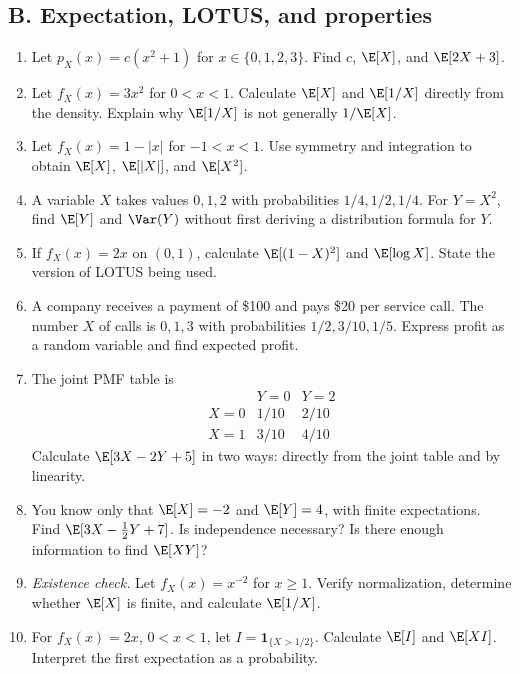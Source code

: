 \subsection{B. Expectation, LOTUS, and properties}
\begin{enumerate}[label=\textbf{B\arabic*.},leftmargin=*,itemsep=0.75em]
\item Let $p_X(x)=c(x^2+1)$ for $x\in\{0,1,2,3\}$. Find $c$, $\E[X]$, and $\E[2X+3]$.
\item Let $f_X(x)=3x^2$ for $0<x<1$. Calculate $\E[X]$ and $\E[1/X]$ directly from the density. Explain why $\E[1/X]$ is not generally $1/\E[X]$.
\item Let $f_X(x)=1-|x|$ for $-1<x<1$. Use symmetry and integration to obtain $\E[X]$, $\E[|X|]$, and $\E[X^2]$.
\item A variable $X$ takes values $0,1,2$ with probabilities $1/4,1/2,1/4$. For $Y=X^2$, find $\E[Y]$ and $\Var(Y)$ without first deriving a distribution formula for $Y$.
\item If $f_X(x)=2x$ on $(0,1)$, calculate $\E[(1-X)^2]$ and $\E[\log X]$. State the version of LOTUS being used.
\item A company receives a payment of \$100 and pays \$20 per service call. The number $X$ of calls is $0,1,3$ with probabilities $1/2,3/10,1/5$. Express profit as a random variable and find expected profit.
\item The joint PMF table is
\[
\begin{array}{c|cc}
 &Y=0&Y=2\\\hline
X=0&1/10&2/10\\
X=1&3/10&4/10
\end{array}
\]
Calculate $\E[3X-2Y+5]$ in two ways: directly from the joint table and by linearity.
\item You know only that $\E[X]=-2$ and $\E[Y]=4$, with finite expectations. Find $\E[3X-\tfrac12Y+7]$. Is independence necessary? Is there enough information to find $\E[XY]$?
\item \textit{Existence check.} Let $f_X(x)=x^{-2}$ for $x\geq1$. Verify normalization, determine whether $\E[X]$ is finite, and calculate $\E[1/X]$.
\item For $f_X(x)=2x$, $0<x<1$, let $I=\mathbf1_{\{X>1/2\}}$. Calculate $\E[I]$ and $\E[XI]$. Interpret the first expectation as a probability.
\end{enumerate}

